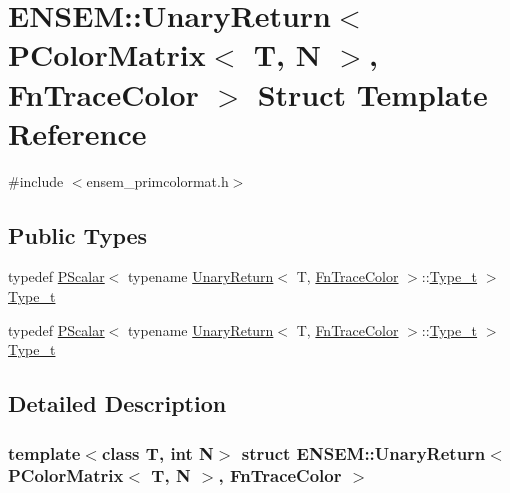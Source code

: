 \hypertarget{structENSEM_1_1UnaryReturn_3_01PColorMatrix_3_01T_00_01N_01_4_00_01FnTraceColor_01_4}{}\section{E\+N\+S\+EM\+:\+:Unary\+Return$<$ P\+Color\+Matrix$<$ T, N $>$, Fn\+Trace\+Color $>$ Struct Template Reference}
\label{structENSEM_1_1UnaryReturn_3_01PColorMatrix_3_01T_00_01N_01_4_00_01FnTraceColor_01_4}


{\ttfamily \#include $<$ensem\+\_\+primcolormat.\+h$>$}

\subsection*{Public Types}
\begin{DoxyCompactItemize}
\item 
typedef \mbox{\hyperlink{classENSEM_1_1PScalar}{P\+Scalar}}$<$ typename \mbox{\hyperlink{structENSEM_1_1UnaryReturn}{Unary\+Return}}$<$ T, \mbox{\hyperlink{structENSEM_1_1FnTraceColor}{Fn\+Trace\+Color}} $>$\+::\mbox{\hyperlink{structENSEM_1_1UnaryReturn_3_01PColorMatrix_3_01T_00_01N_01_4_00_01FnTraceColor_01_4_afd2c41bfcf24b11918ac3aa892d38881}{Type\+\_\+t}} $>$ \mbox{\hyperlink{structENSEM_1_1UnaryReturn_3_01PColorMatrix_3_01T_00_01N_01_4_00_01FnTraceColor_01_4_afd2c41bfcf24b11918ac3aa892d38881}{Type\+\_\+t}}
\item 
typedef \mbox{\hyperlink{classENSEM_1_1PScalar}{P\+Scalar}}$<$ typename \mbox{\hyperlink{structENSEM_1_1UnaryReturn}{Unary\+Return}}$<$ T, \mbox{\hyperlink{structENSEM_1_1FnTraceColor}{Fn\+Trace\+Color}} $>$\+::\mbox{\hyperlink{structENSEM_1_1UnaryReturn_3_01PColorMatrix_3_01T_00_01N_01_4_00_01FnTraceColor_01_4_afd2c41bfcf24b11918ac3aa892d38881}{Type\+\_\+t}} $>$ \mbox{\hyperlink{structENSEM_1_1UnaryReturn_3_01PColorMatrix_3_01T_00_01N_01_4_00_01FnTraceColor_01_4_afd2c41bfcf24b11918ac3aa892d38881}{Type\+\_\+t}}
\end{DoxyCompactItemize}


\subsection{Detailed Description}
\subsubsection*{template$<$class T, int N$>$\newline
struct E\+N\+S\+E\+M\+::\+Unary\+Return$<$ P\+Color\+Matrix$<$ T, N $>$, Fn\+Trace\+Color $>$}

